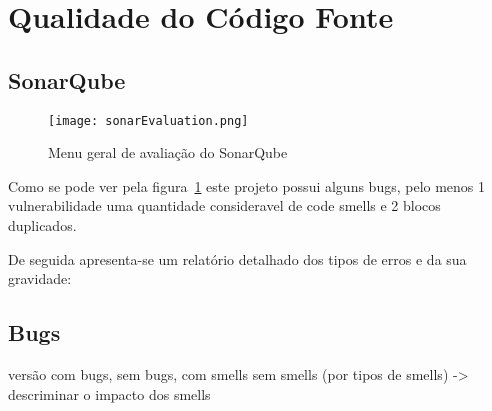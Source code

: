\section{Qualidade do Código Fonte}

\subsection{SonarQube}

\begin{figure}[H]

  \centering

  \texttt{[image: sonarEvaluation.png]}

  \caption {Menu geral de avaliação do SonarQube}

  \label {fig01}

\end{figure}


\par Como se pode ver pela figura~\ref{fig01} este projeto possui alguns bugs, pelo menos 1 vulnerabilidade uma quantidade consideravel de code smells e 2 blocos duplicados.


De seguida apresenta-se um relatório detalhado dos tipos de erros e da sua gravidade:
\subsection{Bugs}
versão com bugs, sem bugs, com smells sem smells (por tipos de smells) -> descriminar o impacto dos smells
